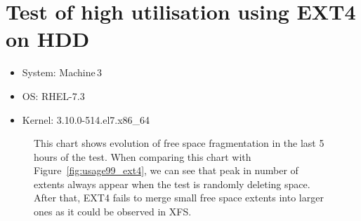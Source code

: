 \documentclass[
  color, %
  table, %
  lof,   %
  lot,   %
]{fithesis3}
\begin{document}
\section{Test of high utilisation using EXT4 on HDD}
\begin{itemize}
\itemsep0em 
   \item System: Machine\,3
   \item OS: RHEL-7.3
   \item Kernel: 3.10.0-514.el7.x86\_64
\end{itemize}

\begin{figure}[h]
    \centering
    \caption[Evolution of free space fragmentation of EXT4 during testing of high utilisation of HDD]{This chart shows evolution of free space fragmentation in the last 5 hours of the test. When comparing this chart with Figure~\ref{fig:usage99_ext4}, we can see that peak in number of extents always appear when the test is randomly deleting space. After that, EXT4 fails to merge small free space extents into larger ones as it could be observed in XFS.}
    \label{fig:free99_ext4}
\end{figure}
\end{document}
